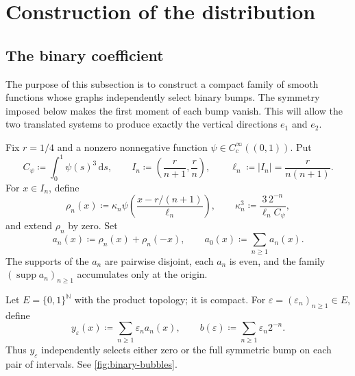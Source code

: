 \documentclass[11pt]{amsart}
\numberwithin{equation}{section}
\theoremstyle{remark}
\newcommand{\N}{\mathbb N}
\newcommand{\dd}{\,\mathrm d}
\begin{document}
\section{Construction of the distribution}

\subsection{The binary coefficient}
The purpose of this subsection is to construct a compact family of smooth
functions whose graphs independently select binary bumps.  The symmetry
imposed below makes the first moment of each bump vanish.  This will allow
the two translated systems to produce
exactly the vertical directions $e_1$ and $e_2$.

Fix $r=1/4$ and a nonzero nonnegative function
$\psi\in C_c^\infty((0,1))$.  Put
\begin{equation}
 C_\psi\coloneq \int_0^1\psi(s)^3\dd s,
 \qquad
 I_n\coloneq \left(\frac{r}{n+1},\frac{r}{n}\right),
 \qquad
 \ell_n\coloneq |I_n|=\frac{r}{n(n+1)}.
\end{equation}
For $x\in I_n$, define
\begin{equation}
 \rho_n(x)\coloneq
 \kappa_n\psi\!\left(\frac{x-r/(n+1)}{\ell_n}\right),
 \qquad
 \kappa_n^3\coloneq\frac{3\,2^{-n}}{\ell_nC_\psi},
\end{equation}
and extend $\rho_n$ by zero.  Set
\begin{equation}
 a_n(x)\coloneq \rho_n(x)+\rho_n(-x),
 \qquad
 a_0(x)\coloneq\sum_{n\geq1}a_n(x).
\end{equation}
The supports of the $a_n$ are pairwise disjoint, each $a_n$ is even, and
the family $(\operatorname{supp}a_n)_{n\geq1}$ accumulates only at the
origin.

Let $E=\{0,1\}^{\N}$ with the product topology; it is compact.  For
$\varepsilon=(\varepsilon_n)_{n\geq1}\in E$, define
\begin{equation}
 y_\varepsilon(x)\coloneq\sum_{n\geq1}\varepsilon_na_n(x),
 \qquad
 b(\varepsilon)\coloneq\sum_{n\geq1}\varepsilon_n2^{-n}.
\end{equation}
Thus $y_\varepsilon$ independently selects either zero or the full symmetric
bump on each pair of intervals. See \cref{fig:binary-bubbles}.
\end{document}
